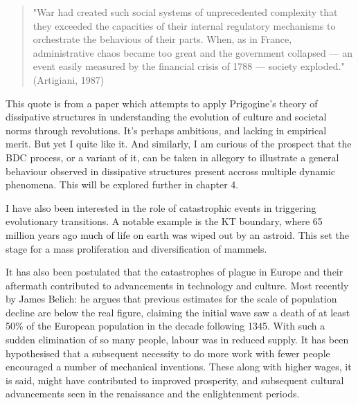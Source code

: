 \begin{quotation}
"War had created such social systems of unprecedented complexity that they exceeded the capacities of their internal
regulatory mechanisms to orchestrate the behavious of their parts. When, as in France, administrative chaos became too 
great and the government collapsed --- an event easily measured by the financial crisis of 1788 --- society exploded." (Artigiani, 1987) \cite{artigiani1987revolution}
\end{quotation}    


This quote is from a paper which attempts to apply Prigogine's theory of dissipative structures in understanding the 
evolution of culture and societal norms through revolutions. It's perhaps ambitious, and lacking in empirical merit.
But yet I quite like it. And similarly, I am curious of the prospect that the BDC process, or a variant of it, can be taken 
in allegory to illustrate a general behaviour observed in dissipative structures present accross multiple dynamic
phenomena. This will be explored further in chapter 4.\par 

I have also been interested in the role of catastrophic events in triggering evolutionary transitions. A notable example
is the KT boundary, where 65 million years ago much of life on earth was wiped out by an astroid. This set the stage for a 
mass proliferation and diversification of mammels.\par

It has also been postulated that the catastrophes of plague in Europe and their aftermath contributed 
to advancements in technology and culture. Most recently by James Belich: he argues that previous estimates for the scale 
of population decline are below the real figure, claiming the initial wave saw a death of at least 50\% of the
European population in the decade following 1345. With such a sudden elimination of so many people, labour was in reduced
supply. It has been hypothesised that a subsequent necessity to do more work with fewer people encouraged a number of
mechanical inventions. These along with higher wages, it is said, might have contributed to improved prosperity, and 
subsequent cultural advancements seen in the renaissance and the enlightenment periods.\par

